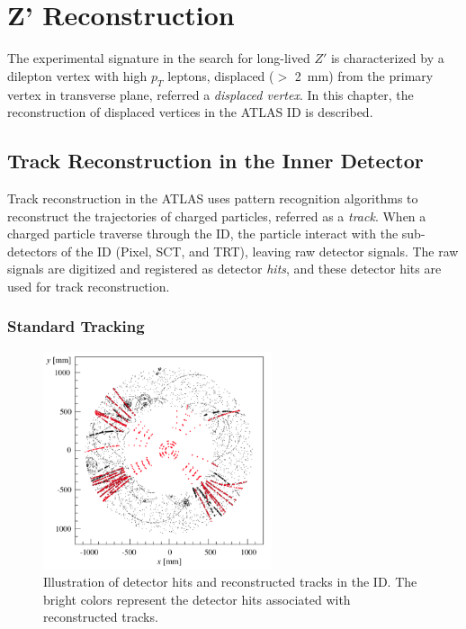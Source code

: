 \chapter{Z' Reconstruction}
\label{chap:reco}

The experimental signature in the search for long-lived $Z'$ is characterized by a dilepton vertex with high $p_{T}$ leptons, displaced ($>$ 2~\si{\milli\meter}) from the primary vertex in transverse plane, referred a \textit{displaced vertex}. In this chapter, the reconstruction of displaced vertices in the ATLAS ID is described.

\section{Track Reconstruction in the Inner Detector}
\label{sec:reco:track}

Track reconstruction in the ATLAS uses pattern recognition algorithms to reconstruct the trajectories of charged particles, referred as a \textit{track}. When a charged particle traverse through the ID, the particle interact with the sub-detectors of the ID (Pixel, SCT, and TRT), leaving raw detector signals. The raw signals are digitized and registered as detector \textit{hits}, and these detector hits are used for track reconstruction. 

\subsection{Standard Tracking}
\label{sec:reco:st}


\begin{figure}[!htb]
    \includegraphics[width=0.6\textwidth]{figures/tracking.png}
    \centering
    \caption{Illustration of detector hits and reconstructed tracks in the ID. The bright colors represent the detector hits associated with reconstructed tracks.}
    \label{fig:tracking}
\end{figure}


